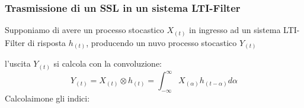         \subsubsection{Trasmissione di un SSL in un sistema LTI-Filter}
            Supponiamo di avere un processo stocastico $X_{(t)}$ in ingresso ad un sistema LTI-Filter di risposta $h_{(t)}$,
            producendo un nuvo processo stocastico $Y_{(t)}$
            \begin{figure}[H]
                \centering
            \end{figure}
            l'uscita $Y_{(t)}$ si calcola con la convoluzione:
            \[
                Y_{(t)} = X_{(t)} \otimes h_{(t)} = \int_{-\infty}^{\infty} X_{(\alpha)} h_{(t-\alpha)} d\alpha
            \]
            Calcolaimone gli indici:
